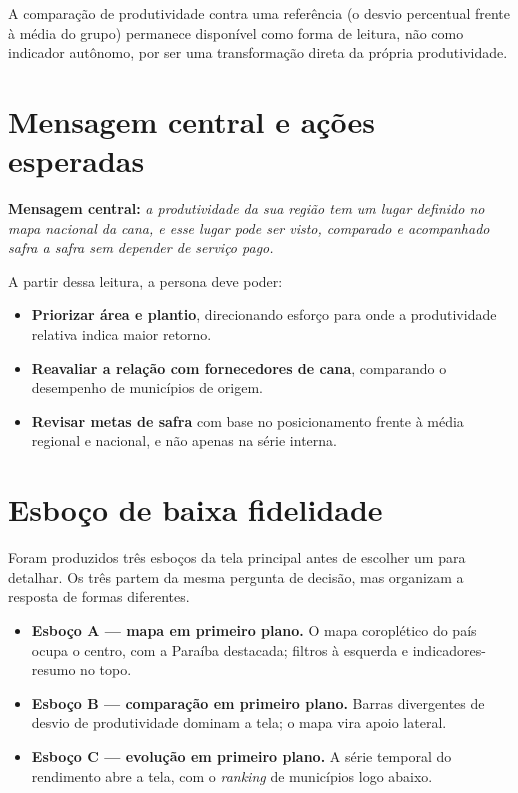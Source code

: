 \documentclass[11pt,a4paper]{article}
\begin{document}
A comparação de produtividade contra uma referência (o desvio percentual frente à média do
grupo) permanece disponível como forma de leitura, não como indicador autônomo, por ser uma
transformação direta da própria produtividade.

\section{Mensagem central e ações esperadas}

\textbf{Mensagem central:} \textit{a produtividade da sua região tem um lugar definido no
mapa nacional da cana, e esse lugar pode ser visto, comparado e acompanhado safra a safra sem
depender de serviço pago.}

A partir dessa leitura, a persona deve poder:
\begin{itemize}
  \item \textbf{Priorizar área e plantio}, direcionando esforço para onde a produtividade
  relativa indica maior retorno.
  \item \textbf{Reavaliar a relação com fornecedores de cana}, comparando o desempenho de
  municípios de origem.
  \item \textbf{Revisar metas de safra} com base no posicionamento frente à média regional e
  nacional, e não apenas na série interna.
\end{itemize}

\section{Esboço de baixa fidelidade}\label{sec:esboco}

Foram produzidos três esboços da tela principal antes de escolher um para detalhar. Os três
partem da mesma pergunta de decisão, mas organizam a resposta de formas diferentes.

\begin{itemize}
  \item \textbf{Esboço A — mapa em primeiro plano.} O mapa coroplético do país ocupa o centro,
  com a Paraíba destacada; filtros à esquerda e indicadores-resumo no topo.
  \item \textbf{Esboço B — comparação em primeiro plano.} Barras divergentes de desvio de
  produtividade dominam a tela; o mapa vira apoio lateral.
  \item \textbf{Esboço C — evolução em primeiro plano.} A série temporal do rendimento abre a
  tela, com o \textit{ranking} de municípios logo abaixo.
\end{itemize}
\end{document}
